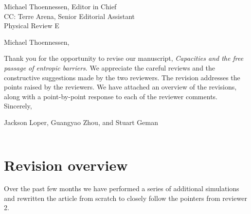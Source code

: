 \documentclass{article}
\begin{document}
\hfill{}\begin{minipage}{4in}
\raggedleft
Michael Thoennessen, Editor in Chief\\
CC: Terre Arena, Senior Editorial Assistant\\
Physical Review E\\
\end{minipage}

\vspace{.5in}

\noindent
Michael Thoennessen,

\vspace{.2in}

Thank you for the opportunity to revise our manuscript, {\em Capacities and the free passage of entropic barriers}. We appreciate the careful reviews and the constructive suggestions made by the two reviewers.   The revision addresses the points raised by the reviewers. We have attached an overview of the revisions, along with a point-by-point response to each of the reviewer comments. \\

\noindent
Sincerely,

Jackson Loper, Guangyao Zhou, and Stuart Geman\\\\


\newpage

\section{Revision overview}

Over the past few months we have performed a series of additional simulations and rewritten the article from scratch to closely follow the pointers from reviewer 2.
\end{document}
